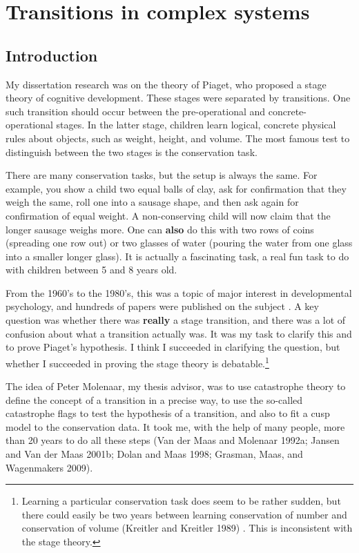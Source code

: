 \documentclass[
  letterpaper,
]{scrbook}
\begin{document}

\hypertarget{transitions-in-complex-systems}{%
\chapter{Transitions in complex
systems}\label{transitions-in-complex-systems}}

\hypertarget{introduction-2}{%
\section{Introduction}\label{introduction-2}}

My dissertation research was on the theory of Piaget, who proposed a
stage theory of cognitive development. These stages were separated by
transitions. One such transition should occur between the
pre-operational and concrete-operational stages. In the latter stage,
children learn logical, concrete physical rules about objects, such as
weight, height, and volume. The most famous test to distinguish between
the two stages is the conservation task.

There are many conservation tasks, but the setup is always the same. For
example, you show a child two equal balls of clay, ask for confirmation
that they weigh the same, roll one into a sausage shape, and then ask
again for confirmation of equal weight. A non-conserving child will now
claim that the longer sausage weighs more. One can \textbf{also} do this
with two rows of coins (spreading one row out) or two glasses of water
(pouring the water from one glass into a smaller longer glass). It is
actually a fascinating task, a real fun task to do with children between
5 and 8 years old.

From the 1960's to the 1980's, this was a topic of major interest in
developmental psychology, and hundreds of papers were published on the
subject . A key question was whether there was \textbf{really} a stage
transition, and there was a lot of confusion about what a transition
actually was. It was my task to clarify this and to prove Piaget's
hypothesis. I think I succeeded in clarifying the question, but whether
I succeeded in proving the stage theory is debatable.\footnote{Learning
  a particular conservation task does seem to be rather sudden, but
  there could easily be two years between learning conservation of
  number and conservation of volume (Kreitler and Kreitler 1989) . This
  is inconsistent with the stage theory.}

The idea of Peter Molenaar, my thesis advisor, was to use catastrophe
theory to define the concept of a transition in a precise way, to use
the so-called catastrophe flags to test the hypothesis of a transition,
and also to fit a cusp model to the conservation data. It took me, with
the help of many people, more than 20 years to do all these steps (Van
der Maas and Molenaar 1992a; Jansen and Van der Maas 2001b; Dolan and
Maas 1998; Grasman, Maas, and Wagenmakers 2009).
\end{document}
